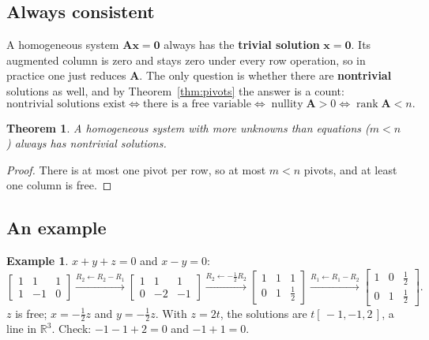 \documentclass[11pt]{article}
\theoremstyle{plain}
\newtheorem{thm}{Theorem}[section]
\theoremstyle{definition}
\newtheorem{ex}{Example}[section]
\theoremstyle{remark}
\newcommand{\R}{\mathbb{R}}
\newcommand{\vc}[1]{\mathbf{#1}}
\newcommand{\mt}[1]{\mathbf{#1}}
\DeclareMathOperator{\rank}{rank}
\DeclareMathOperator{\nullity}{nullity}
\begin{document}
\subsection{Always consistent}
A homogeneous system $\mt{A}\vc{x}=\vc{0}$ always has the \textbf{trivial
solution} $\vc{x}=\vc{0}$. Its augmented column is zero and stays zero under every
row operation, so in practice one just reduces $\mt{A}$. The only question is
whether there are \textbf{nontrivial} solutions as well, and by
Theorem~\ref{thm:pivots} the answer is a count:
\[
  \text{nontrivial solutions exist}
  \iff \text{there is a free variable}
  \iff \nullity\mt{A}>0
  \iff \rank\mt{A}<n .
\]

\begin{thm}
A homogeneous system with more unknowns than equations ($m<n$) always has
nontrivial solutions.
\end{thm}

\begin{proof}
There is at most one pivot per row, so at most $m<n$ pivots, and at least one
column is free.
\end{proof}

\subsection{An example}
\begin{ex}
$x+y+z=0$ and $x-y=0$:
\[
  \begin{bmatrix}1&1&1\\1&-1&0\end{bmatrix}
  \xrightarrow{R_2\gets R_2-R_1}
  \begin{bmatrix}1&1&1\\0&-2&-1\end{bmatrix}
  \xrightarrow{R_2\gets-\frac12R_2}
  \begin{bmatrix}1&1&1\\0&1&\frac12\end{bmatrix}
  \xrightarrow{R_1\gets R_1-R_2}
  \begin{bmatrix}1&0&\frac12\\0&1&\frac12\end{bmatrix}.
\]
$z$ is free; $x=-\frac12z$ and $y=-\frac12z$. With $z=2t$, the solutions are
$t[\,-1,-1,2\,]$, a line in $\R^{3}$. Check: $-1-1+2=0$ and $-1+1=0$.
\end{ex}
\end{document}

